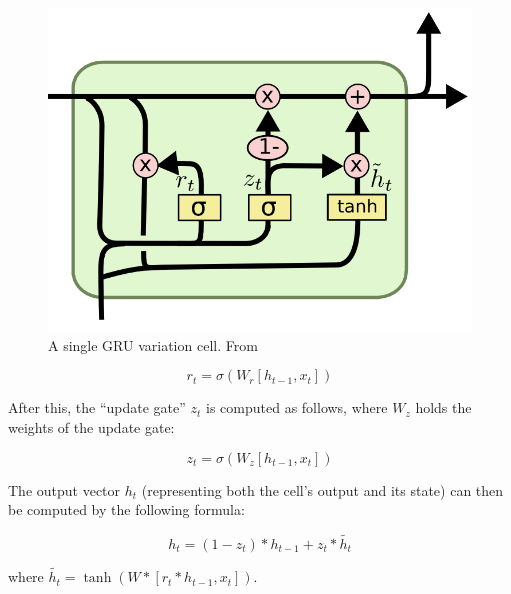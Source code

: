         \begin{figure}[h!]
            \begin{center}
                \includegraphics[scale=0.5]{figs/gru_cell.png}
            \end{center}
            \caption{A single GRU variation cell. From \cite{olah2015understanding}
            \label{fig:gru_cell}}
        \end{figure}

        \begin{equation}
            r_t = \sigma\left(W_r [h_{t-1}, x_t]\right)
            \label{eq:gru_reset_gate}
        \end{equation}

        After this, the ``update gate'' $z_t$ is computed as follows, where $W_z$ holds the weights of the update gate:

        \begin{equation}
            z_t = \sigma\left(W_z [h_{t-1}, x_t]\right)
            \label{eq:gru_update_gate}
        \end{equation}

        The output vector $h_t$ (representing both the cell's output and its state) can then be computed by the following formula:

        \begin{equation}
            h_t = (1 - z_t) * h_{t-1} + z_t * \tilde{h_t}
            \label{eq:gru_output}
        \end{equation}

        where $\tilde{h_t} = \tanh(W * [r_t * h_{t-1}, x_t])$.

